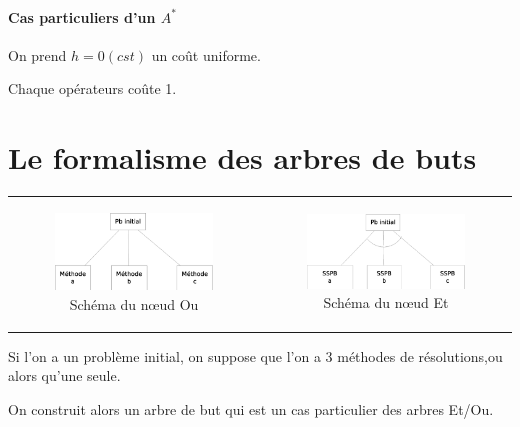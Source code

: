 \documentclass[12pt,a4paper,openany]{book}
\begin{document}
		\subsubsection{Cas particuliers d'un $A^*$}
		On prend $h=0(cst)$ un coût uniforme.

		\begin{exemple}
			Chaque opérateurs coûte 1.
		\end{exemple}

	\chapter{Le formalisme des arbres de buts}
	\begin{tabular}{cc}
		\begin{minipage}{0.5\textwidth}
		\begin{figure}[H]
			\centering
			\includegraphics[width=9cm]{diag3.eps}
			\caption{Schéma du nœud Ou}
		\end{figure}
		\end{minipage}
		&
		\begin{minipage}{0.5\textwidth}
		\begin{figure}[H]
			\centering
			\includegraphics[width=9cm]{diag4.eps}
			\caption{Schéma du nœud Et}
		\end{figure}
		\end{minipage}
	\end{tabular}

	Si l'on a un problème initial, on suppose que l'on a 3 méthodes de résolutions,ou alors qu'une seule.

	On construit alors un arbre de but qui est un cas particulier des arbres Et/Ou.
\end{document}
